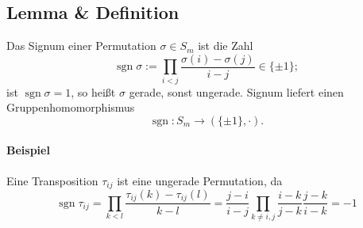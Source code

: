 \subsection{Lemma \& Definition}
	\begin{Definition}
	Das Signum einer Permutation $ \sigma\in S_m $ ist die Zahl
		\[ \operatorname{sgn}\sigma := \prod_{i<j} \frac{\sigma(i)-\sigma(j)}{i-j}\in \{\pm 1\}; \]
	ist $ \operatorname{sgn}\sigma = 1 $, so heißt $ \sigma $ gerade, sonst ungerade. Signum liefert einen Gruppenhomomorphismus
		\[ \operatorname{sgn}: S_m\to (\{\pm 1\},\cdot). \]
	\end{Definition}
\paragraph{Beispiel}
	Eine Transposition $ \tau_{ij} $ ist eine ungerade Permutation, da
		\[ \operatorname{sgn}\tau_{ij} = \prod_{k<l}\frac{\tau_{ij}(k)-\tau_{ij}(l)}{k-l} = \frac{j-i}{i-j}\prod_{k\neq i,j}\frac{i-k}{j-k}\frac{j-k}{i-k} = -1 \]